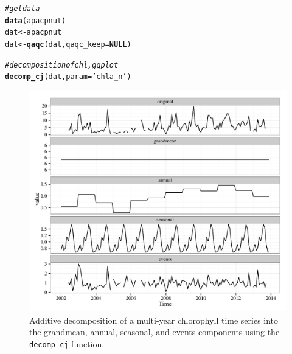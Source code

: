 \documentclass[10pt,letterpaper]{article}\usepackage[]{graphicx}\usepackage[]{color}
\makeatletter
\def\maxwidth{ %
  \ifdim\Gin@nat@width>\linewidth
    \linewidth
  \else
    \Gin@nat@width
  \fi
}
\newcommand{\hlstr}[1]{\textcolor[rgb]{0.192,0.494,0.8}{#1}}%
\newcommand{\hlcom}[1]{\textcolor[rgb]{0.678,0.584,0.686}{\textit{#1}}}%
\newcommand{\hlstd}[1]{\textcolor[rgb]{0.345,0.345,0.345}{#1}}%
\newcommand{\hlkwa}[1]{\textcolor[rgb]{0.161,0.373,0.58}{\textbf{#1}}}%
\newcommand{\hlkwb}[1]{\textcolor[rgb]{0.69,0.353,0.396}{#1}}%
\newcommand{\hlkwc}[1]{\textcolor[rgb]{0.333,0.667,0.333}{#1}}%
\newcommand{\hlkwd}[1]{\textcolor[rgb]{0.737,0.353,0.396}{\textbf{#1}}}%
\newenvironment{kframe}{%
 \def\at@end@of@kframe{}%
 \ifinner\ifhmode%
  \def\at@end@of@kframe{\end{minipage}}%
  \begin{minipage}{\columnwidth}%
 \fi\fi%
 \def\FrameCommand##1{\hskip\@totalleftmargin \hskip-\fboxsep
 \colorbox{shadecolor}{##1}\hskip-\fboxsep
     \hskip-\linewidth \hskip-\@totalleftmargin \hskip\columnwidth}%
 \MakeFramed {\advance\hsize-\width
   \@totalleftmargin\z@ \linewidth\hsize
   \@setminipage}}%
 {\par\unskip\endMakeFramed%
 \at@end@of@kframe}
\newenvironment{knitrout}{}{} %
\makeatother
\begin{document}
\begin{knitrout}
\color{fgcolor}\begin{kframe}
\begin{alltt}
\hlcom{# get data}
\hlkwd{data}\hlstd{(apacpnut)}
\hlstd{dat} \hlkwb{<-} \hlstd{apacpnut}
\hlstd{dat} \hlkwb{<-} \hlkwd{qaqc}\hlstd{(dat,} \hlkwc{qaqc_keep} \hlstd{=} \hlkwa{NULL}\hlstd{)}

\hlcom{# decomposition of chl, ggplot}
\hlkwd{decomp_cj}\hlstd{(dat,} \hlkwc{param} \hlstd{=} \hlstr{'chla_n'}\hlstd{)}
\end{alltt}
\end{kframe}\begin{figure}[!ht]


{\centering \includegraphics[width=\maxwidth]{figure/decomp_ex2} 

}

\caption[Additive decomposition of a multi-year chlorophyll time series into the grandmean, annual, seasonal, and events components using the \texttt{decomp\_cj} function]{Additive decomposition of a multi-year chlorophyll time series into the grandmean, annual, seasonal, and events components using the \texttt{decomp\_cj} function.\label{fig:decomp_ex2}}
\end{figure}


\end{knitrout}
\end{document}
